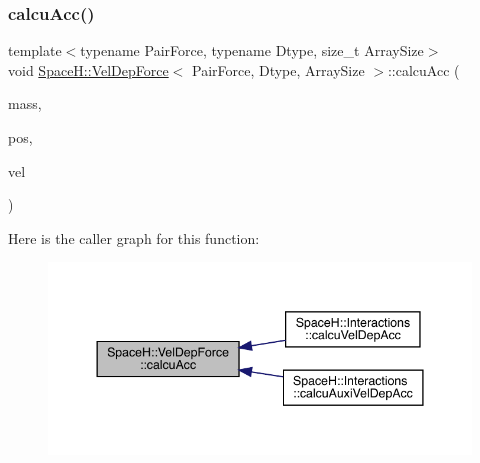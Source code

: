 \subsubsection{\texorpdfstring{calcu\+Acc()}{calcuAcc()}\hspace{0.1cm}{\footnotesize\ttfamily [1/2]}}
{\footnotesize\ttfamily template$<$typename Pair\+Force, typename Dtype, size\+\_\+t Array\+Size$>$ \\
void \mbox{\hyperlink{struct_space_h_1_1_vel_dep_force}{Space\+H\+::\+Vel\+Dep\+Force}}$<$ Pair\+Force, Dtype, Array\+Size $>$\+::calcu\+Acc (\begin{DoxyParamCaption}\item[{const \mbox{\hyperlink{struct_space_h_1_1_vel_dep_force_ae4efbb88779fc063293b7853184378ac}{Scalar\+Array}} \&}]{mass,  }\item[{const \mbox{\hyperlink{struct_space_h_1_1_vel_dep_force_ad2d0301ffff67a74018b92c17a3475de}{Vector\+Array}} \&}]{pos,  }\item[{const \mbox{\hyperlink{struct_space_h_1_1_vel_dep_force_ad2d0301ffff67a74018b92c17a3475de}{Vector\+Array}} \&}]{vel }\end{DoxyParamCaption})\hspace{0.3cm}{\ttfamily [inline]}}

Here is the caller graph for this function\+:
\nopagebreak
\begin{figure}[H]
\begin{center}
\leavevmode
\includegraphics[width=344pt]{struct_space_h_1_1_vel_dep_force_af317008a8a1371f2a36f9b44835343f2_icgraph}
\end{center}
\end{figure}
\mbox{\label{struct_space_h_1_1_vel_dep_force_a0c90022c26911e9471e9d340e512124b}} 
